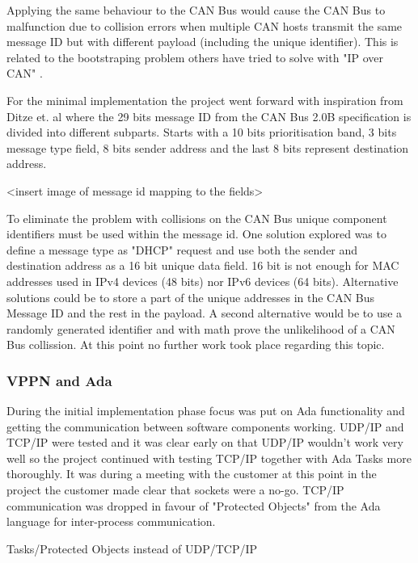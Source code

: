 Applying the same behaviour to the CAN Bus would cause the CAN Bus to
malfunction due to collision errors when multiple CAN hosts transmit the same
message ID but with different payload (including the unique identifier).
This is related to the bootstraping problem others have tried to solve with
"IP over CAN" \cite{web:draft-ip_over_can, web:porting_ip_can}.

For the minimal implementation the project went forward with inspiration from
Ditze et. al \cite{web:porting_ip_can} where the 29 bits message ID from the
CAN Bus 2.0B specification is divided into different subparts. Starts with a 10
bits prioritisation band, 3 bits message type field, 8 bits sender address and
the last 8 bits represent destination address.

<insert image of message id mapping to the fields>

To eliminate the problem with collisions on the CAN Bus unique component
identifiers must be used within the message id. One solution explored was to
define a message type as "DHCP" request and use both the sender and destination
address as a 16 bit unique data field. 16 bit is not enough for MAC addresses
used in IPv4 devices (48 bits) nor IPv6 devices (64 bits). Alternative
solutions could be to store a part of the unique addresses in the CAN Bus
Message ID and the rest in the payload. A second alternative would be
to use a randomly generated identifier and with math prove the unlikelihood of
a CAN Bus collission. At this point no further work took place regarding this topic.

\subsubsection{VPPN and Ada}
During the initial implementation phase focus was put on Ada functionality and
getting the communication between software components working. UDP/IP and TCP/IP
were tested and it was clear early on that UDP/IP wouldn't work very well so
the project continued with testing TCP/IP together with Ada Tasks more
thoroughly. It was during a meeting with the customer at this point in the
project the customer made clear that sockets were a no-go. TCP/IP communication
was dropped in favour of "Protected Objects" from the Ada language for
inter-process communication.

Tasks/Protected Objects instead of UDP/TCP/IP

%
